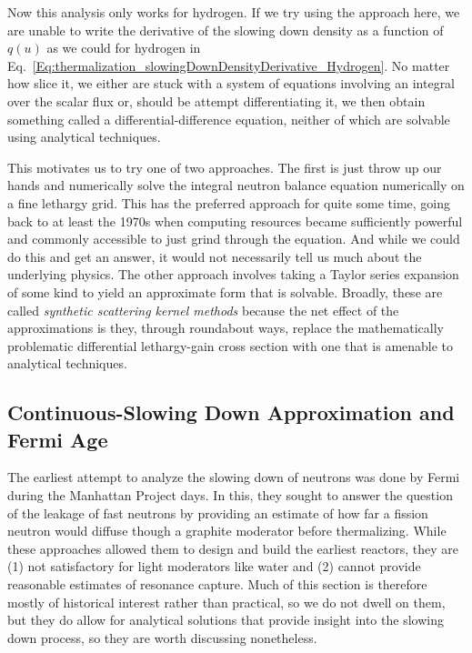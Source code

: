 Now this analysis only works for hydrogen. If we try using the approach here, we are unable to write the derivative of the slowing down density as a function of $q(u)$ as we could for hydrogen in Eq.~\eqref{Eq:thermalization_slowingDownDensityDerivative_Hydrogen}. No matter how slice it, we either are stuck with a system of equations involving an integral over the scalar flux or, should be attempt differentiating it, we then obtain something called a differential-difference equation, neither of which are solvable using analytical techniques. 

This motivates us to try one of two approaches. The first is just throw up our hands and numerically solve the integral neutron balance equation numerically on a fine lethargy grid. This has the preferred approach for quite some time, going back to at least the 1970s when computing resources became sufficiently powerful and commonly accessible to just grind through the equation. And while we could do this and get an answer, it would not necessarily tell us much about the underlying physics. The other approach involves taking a Taylor series expansion of some kind to yield an approximate form that is solvable. Broadly, these are called \emph{synthetic scattering kernel methods} because the net effect of the approximations is they, through roundabout ways, replace the mathematically problematic differential lethargy-gain cross section with one that is amenable to analytical techniques.

\subsection{Continuous-Slowing Down Approximation and Fermi Age}

The earliest attempt to analyze the slowing down of neutrons was done by Fermi during the Manhattan Project days. In this, they sought to answer the question of the leakage of fast neutrons by providing an estimate of how far a fission neutron would diffuse though a graphite moderator before thermalizing. While these approaches allowed them to design and build the earliest reactors, they are (1) not satisfactory for light moderators like water and (2) cannot provide reasonable estimates of resonance capture. Much of this section is therefore mostly of historical interest rather than practical, so we do not dwell on them, but they do allow for analytical solutions that provide insight into the slowing down process, so they are worth discussing nonetheless.


